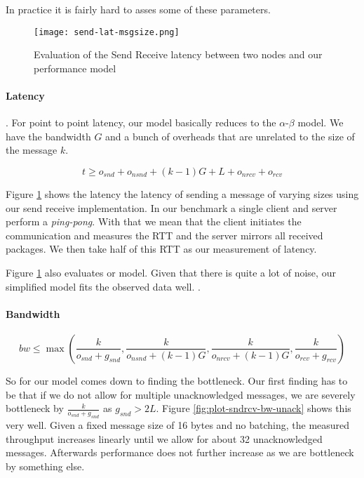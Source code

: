 In practice it is fairly hard to asses some of these parameters. 


\begin{figure}[h]
\texttt{[image: send-lat-msgsize.png]}
\caption{Evaluation of the Send Receive latency between two nodes and our performance model}
\label{fig:plot-sndrcv-lat}
\end{figure}

\paragraph{Latency} . For point to point latency, our model basically reduces to the $\alpha$-$\beta$ model. We
have the bandwidth $G$ and a bunch of overheads that are unrelated to the size of the message $k$.

$$
t \geq o_{snd} + o_{nsnd}  + (k-1)G + L + o_{nrcv} + o_{rcv}
$$

Figure \ref{fig:plot-sndrcv-lat} shows the latency the latency of sending a message of varying sizes using our send receive 
implementation. In our benchmark a single client and server 
perform a \emph{ping-pong}. With that we mean that the client initiates the communication and measures the RTT and the server
mirrors all received packages. We then take half of this RTT as our measurement of latency.


Figure \ref{fig:plot-sndrcv-lat} also evaluates or model. Given that there is quite a lot of noise, our simplified model fits
the observed data well. . 

\paragraph{Bandwidth}


$$
bw \leq \max ( \frac{k}{o_{snd} + g_{snd}}, \frac{k}{o_{nsnd} + (k-1)G}, \frac{k}{o_{nrcv} + (k-1)G}, \frac{k}{o_{rcv} + g_{rcv}})
$$

So for our model comes down to finding the bottleneck. Our first finding has to be that if we do not allow for multiple 
unacknowledged messages, we are severely bottleneck by $\frac{k}{o_{snd} + g_{snd}}$ as $g_{snd} > 2L$. Figure 
\ref{fig:plot-sndrcv-bw-unack} shows this very well. Given a fixed message size of 16 bytes and no batching, the measured 
throughput increases linearly until we allow for about 32 unacknowledged messages. Afterwards performance does not further 
increase as we are bottleneck by something else. 

